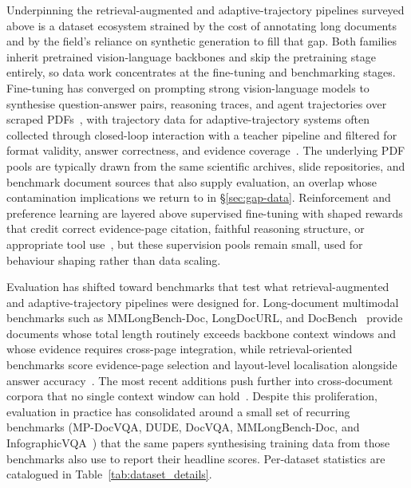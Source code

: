 \documentclass[11pt]{article}
\begin{document}
Underpinning the retrieval-augmented and adaptive-trajectory pipelines surveyed above is a dataset ecosystem strained by the cost of annotating long documents and by the field's reliance on synthetic generation to fill that gap. Both families inherit pretrained vision-language backbones and skip the pretraining stage entirely, so data work concentrates at the fine-tuning and benchmarking stages. Fine-tuning has converged on prompting strong vision-language models to synthesise question-answer pairs, reasoning traces, and agent trajectories over scraped PDFs~\cite{xie2024wukong,tanaka2025vdocrag,wu2025molorag,zhang2026docdancer,guo2026endtoend}, with trajectory data for adaptive-trajectory systems often collected through closed-loop interaction with a teacher pipeline and filtered for format validity, answer correctness, and evidence coverage~\cite{zheng2026docv,zhang2026docdancer}. The underlying PDF pools are typically drawn from the same scientific archives, slide repositories, and benchmark document sources that also supply evaluation, an overlap whose contamination implications we return to in \S\ref{sec:gap-data}. Reinforcement and preference learning are layered above supervised fine-tuning with shaped rewards that credit correct evidence-page citation, faithful reasoning structure, or appropriate tool use~\cite{xiong2026docr1,guo2026endtoend,yu2025mact}, but these supervision pools remain small, used for behaviour shaping rather than data scaling.

Evaluation has shifted toward benchmarks that test what retrieval-augmented and adaptive-trajectory pipelines were designed for. Long-document multimodal benchmarks such as MMLongBench-Doc, LongDocURL, and DocBench~\cite{ma2024mmlongbenchdoc,deng2025longdocurl,zou2024docbench} provide documents whose total length routinely exceeds backbone context windows and whose evidence requires cross-page integration, while retrieval-oriented benchmarks score evidence-page selection and layout-level localisation alongside answer accuracy~\cite{hui2024uda,xiong2026docr1,zhu2025doclens}. The most recent additions push further into cross-document corpora that no single context window can hold~\cite{cho2024m3docrag,wang2025vidorag}. Despite this proliferation, evaluation in practice has consolidated around a small set of recurring benchmarks (MP-DocVQA, DUDE, DocVQA, MMLongBench-Doc, and InfographicVQA~\cite{tito2023hierarchical,vanlandeghem2023document,mathew2021docvqa,mathew2022infographicvqa,ma2024mmlongbenchdoc}) that the same papers synthesising training data from those benchmarks also use to report their headline scores. Per-dataset statistics are catalogued in Table~\ref{tab:dataset_details}.
\end{document}
